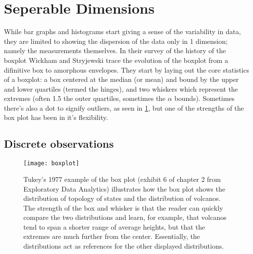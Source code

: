 \documentclass[../main.tex]{subfiles}
\begin{document}
\section{Seperable Dimensions}
\label{sec:sepdim}

While bar graphs and histograms start giving a sense of the variability in
data, they are limited to showing the dispersion of the data only in 1
dimension; namely the measurements themselves. In their survey of the history
of the boxplot \cite{wickham2011} Wickham and Stryjewski trace the evolution of
the boxplot from a difinitive box to amorphous envelopes.  They start by laying out
the core statistics of a boxplot: a box centered at the median (or mean) and
bound by the upper and lower quartiles (termed the hinges), and two whiskers which represent the
extremes (often 1.5 the outer quartiles, sometimes the $\alpha$ bounds). Sometimes there's
also a dot to signify outliers, as seen in \ref{fig:boxplot}, but one of
the strengths of the box plot has been in it's flexibility. 

\subsection{Discrete observations}

\begin{figure}
\texttt{[image: boxplot]}
\caption{Tukey's 1977 example of the box plot (exhibit 6 of chapter 2 from
Exploratory Data Analytics\cite{tukey1977}) illustrates how the box plot shows
the distribution of topology of states and
the distribution of volcanos. The strength of the box and whisker is that the
reader can quickly compare the two distributions and learn, for example, that
volcanos tend to span a shorter range of average heights, but that the extremes
are much further from the center. Essentially, the distributions act as
references for the other displayed distributions.}
\label{fig:boxplot}
\end{figure}
\end{document}
